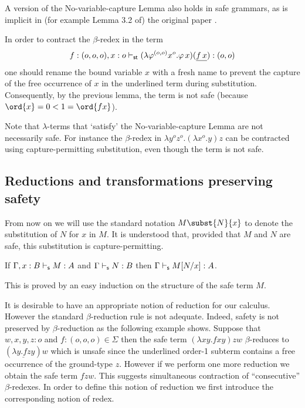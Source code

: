 \begin{remark}
  A version of the No-variable-capture Lemma also holds in safe
  grammars, as is implicit in (for example Lemma 3.2 of) the original
  paper \cite{KNU02}.
\end{remark}

\begin{example}
  In order to contract the $\beta$-redex in the term
\[f:(o,o,o),x:o
  \vdash_{\sf st} (\lambda \varphi^{(o,o)} x^o . \varphi \, x) (\underline{f \,
    x}) : (o,o)\] one should rename the bound variable $x$ with a fresh name to
  prevent the capture of the free occurrence of $x$ in the underlined term during substitution. Consequently, by the previous lemma,
  the term is not safe (because $\ord{x} = 0 < 1
  = \ord{f x}$).
\end{example}

Note that $\lambda$-terms that `satisfy' the No-variable-capture
Lemma are not necessarily safe. For instance the $\beta$-redex in
$\lambda y^o z^o. (\lambda x^o .y) z$ can be contracted using
capture-permitting substitution, even though the term is not safe.

\subsection*{Reductions and transformations preserving safety}

From now on we will use the standard notation $M\subst{N}{x}$ to
denote the substitution of $N$ for $x$ in $M$.  It is understood that,
provided that $M$ and $N$ are safe, this substitution is
capture-permitting.


\begin{lemma}
\label{lem:subst_preserve_safety}
If $\Gamma, x :B \vdash_{\sf s} M : A$ and $\Gamma \vdash_{\sf s} N : B$ then $\Gamma \vdash_{\sf s} M[N/x] : A$.
\end{lemma}
This is proved by an easy induction on the structure of the safe term $M$.


It is desirable to have an appropriate notion of reduction for our
calculus. However the standard $\beta$-reduction rule is not
adequate. Indeed, safety is not preserved by $\beta$-reduction as
the following example shows. Suppose that $w,x,y,z : o$ and $f :
(o,o,o) \in \Sigma$ then the safe term $(\lambda x y . f x y) z w$
$\beta$-reduces to $(\underline{\lambda y . f z y}) w$ which is
unsafe since the underlined order-1 subterm contains a free
occurrence of the ground-type $z$. However if we perform one more
reduction we obtain the safe term $f z w$. This suggests
simultaneous contraction of ``consecutive'' $\beta$-redexes. In
order to define this notion of reduction we first introduce the
corresponding notion of redex.

